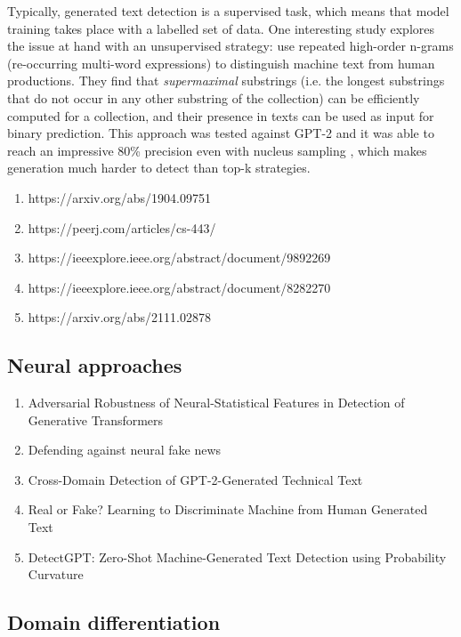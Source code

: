 Typically, generated text detection is a supervised task, which means that model training takes place with a labelled set of data.
One interesting study explores the issue at hand with an unsupervised strategy: \citet{galle2021unsupervised} use repeated high-order n-grams (re-occurring multi-word expressions) to distinguish machine text from human productions.
They find that \emph{supermaximal} substrings (i.e. the longest substrings that do not occur in any other substring of the collection) can be efficiently computed for a collection, and their presence in texts can be used as input for binary prediction.
This approach was tested against GPT-2 and it was able to reach an impressive 80\% precision even with nucleus sampling \citep{holtzman2019curious}, which makes generation much harder to detect than top-k strategies.


\begin{enumerate}
    \item https://arxiv.org/abs/1904.09751
    \item https://peerj.com/articles/cs-443/
    \item https://ieeexplore.ieee.org/abstract/document/9892269
    \item https://ieeexplore.ieee.org/abstract/document/8282270
    \item https://arxiv.org/abs/2111.02878
\end{enumerate}

\subsection{Neural approaches}

\begin{enumerate}
    \item Adversarial Robustness of Neural-Statistical Features in Detection of Generative Transformers
    \item Defending against neural fake news
    \item Cross-Domain Detection of GPT-2-Generated Technical Text
    \item Real or Fake? Learning to Discriminate Machine from Human Generated Text
    \item DetectGPT: Zero-Shot Machine-Generated Text Detection using Probability Curvature
\end{enumerate}


\subsection{Domain differentiation}

